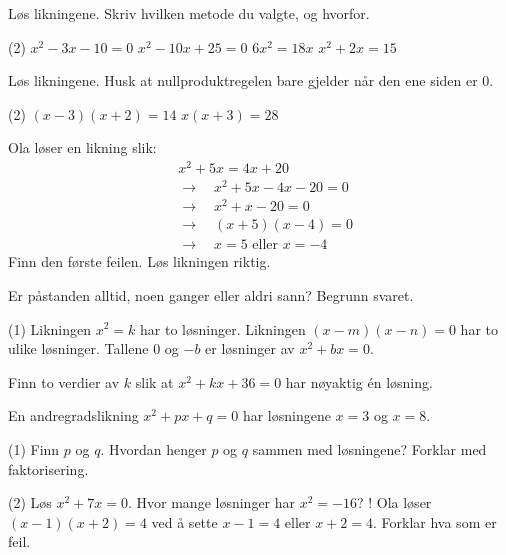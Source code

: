 
Løs likningene. Skriv hvilken metode du valgte, og hvorfor.
\begin{tasks}(2)
  \task $x^2 - 3x - 10 = 0$
  \task $x^2 - 10x + 25 = 0$
  \task $6x^2 = 18x$
  \task $x^2 + 2x = 15$
\end{tasks}

Løs likningene. Husk at nullproduktregelen bare gjelder når den ene siden er 0.
\begin{tasks}(2)
  \task $(x - 3)(x + 2) = 14$
  \task $x(x + 3) = 28$
\end{tasks}

Ola løser en likning slik:
\begin{align*}
&x^2 + 5x = 4x + 20\\
&\longrightarrow\quad x^2 + 5x - 4x - 20 = 0\\
&\longrightarrow\quad x^2 + x - 20 = 0\\
&\longrightarrow\quad (x + 5)(x - 4) = 0\\
&\longrightarrow\quad x = 5 \text{ eller } x = -4
\end{align*}
Finn den første feilen. Løs likningen riktig.


Er påstanden alltid, noen ganger eller aldri sann? Begrunn svaret.
\begin{tasks}(1)
  \task Likningen $x^2 = k$ har to løsninger.
  \task Likningen $(x - m)(x - n) = 0$ har to ulike løsninger.
  \task Tallene $0$ og $-b$ er løsninger av $x^2 + bx = 0$.
\end{tasks}

Finn to verdier av $k$ slik at $x^2 + kx + 36 = 0$ har nøyaktig én løsning.

En andregradslikning $x^2 + px + q = 0$ har løsningene $x = 3$ og $x = 8$.
\begin{tasks}(1)
  \task Finn $p$ og $q$.
  \task Hvordan henger $p$ og $q$ sammen med løsningene? Forklar med faktorisering.
\end{tasks}

\begin{sjekk}
\begin{tasks}(2)
  \task Løs $x^2 + 7x = 0$.
  \task Hvor mange løsninger har $x^2 = -16$?
  \task! Ola løser $(x-1)(x+2) = 4$ ved å sette $x - 1 = 4$ eller $x + 2 = 4$. Forklar hva som er feil.
\end{tasks}
\end{sjekk}

